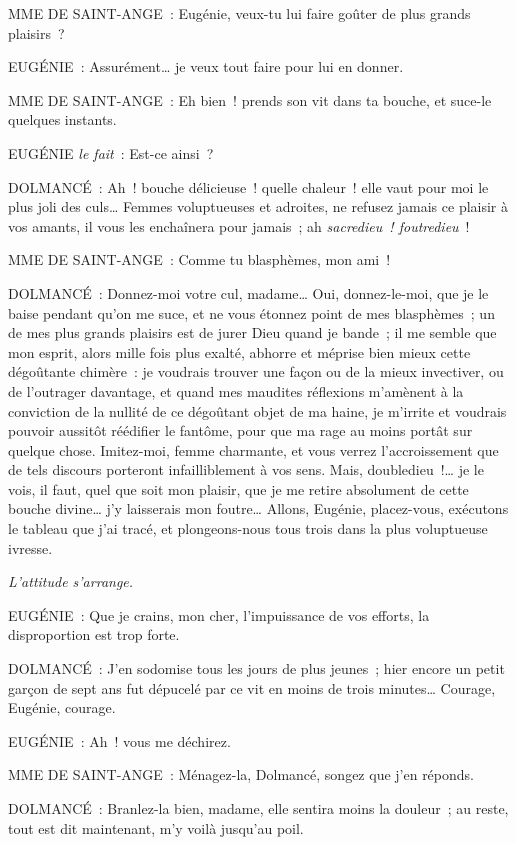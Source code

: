 \documentclass[french,twoside]{book} %
\begin{document}
MME DE SAINT-ANGE : Eugénie, veux-tu lui faire goûter de plus grands plaisirs ?\par
EUGÉNIE : Assurément… je veux tout faire pour lui en donner.\par
MME DE SAINT-ANGE : Eh bien ! prends son vit dans ta bouche, et suce-le quelques instants.\par
EUGÉNIE {\itshape le fait} : Est-ce ainsi ?\par
DOLMANCÉ : Ah ! bouche délicieuse ! quelle chaleur ! elle vaut pour moi le plus joli des culs… Femmes voluptueuses et adroites, ne refusez jamais ce plaisir à vos amants, il vous les enchaînera pour jamais ; ah {\itshape sacredieu ! foutredieu} !\par
MME DE SAINT-ANGE : Comme tu blasphèmes, mon ami !\par
DOLMANCÉ : Donnez-moi votre cul, madame… Oui, donnez-le-moi, que je le baise pendant qu’on me suce, et ne vous étonnez point de mes blasphèmes ; un de mes plus grands plaisirs est de jurer Dieu quand je bande ; il me semble que mon esprit, alors mille fois plus exalté, abhorre et méprise bien mieux cette dégoûtante chimère : je voudrais trouver une façon ou de la mieux invectiver, ou de l’outrager davantage, et quand mes maudites réflexions m’amènent à la conviction de la nullité de ce dégoûtant objet de ma haine, je m’irrite et voudrais pouvoir aussitôt réédifier le fantôme, pour que ma rage au moins portât sur quelque chose. Imitez-moi, femme charmante, et vous verrez l’accroissement que de tels discours porteront infailliblement à vos sens. Mais, doubledieu !… je le vois, il faut, quel que soit mon plaisir, que je me retire absolument de cette bouche divine… j’y laisserais mon foutre… Allons, Eugénie, placez-vous, exécutons le tableau que j’ai tracé, et plongeons-nous tous trois dans la plus voluptueuse ivresse.\par
{\itshape L’attitude s’arrange.}\par
EUGÉNIE : Que je crains, mon cher, l’impuissance de vos efforts, la disproportion est trop forte.\par
DOLMANCÉ : J’en sodomise tous les jours de plus jeunes ; hier encore un petit garçon de sept ans fut dépucelé par ce vit en moins de trois minutes… Courage, Eugénie, courage.\par
EUGÉNIE : Ah ! vous me déchirez.\par
MME DE SAINT-ANGE : Ménagez-la, Dolmancé, songez que j’en réponds.\par
DOLMANCÉ : Branlez-la bien, madame, elle sentira moins la douleur ; au reste, tout est dit maintenant, m’y voilà jusqu’au poil.\par
\end{document}
